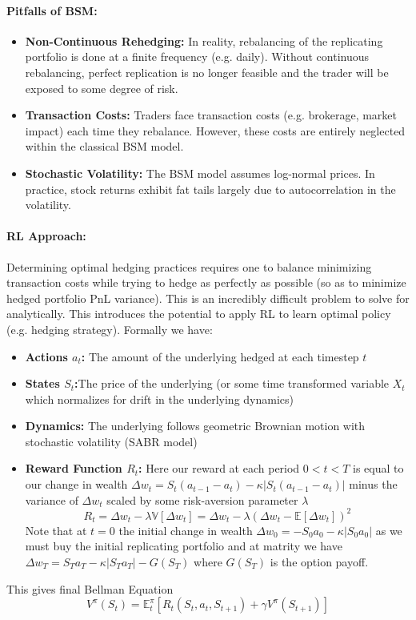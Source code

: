 \documentclass{article}
\begin{document}
\paragraph{Pitfalls of BSM:}
\begin{itemize}
    \item \textbf{Non-Continuous Rehedging:} In reality, rebalancing of the replicating portfolio is done at a finite frequency (e.g. daily). Without continuous rebalancing, perfect replication is no longer feasible and the trader will be exposed to some degree of risk.
    \item \textbf{Transaction Costs:} Traders face transaction costs (e.g. brokerage, market impact) each time they rebalance. However, these costs are entirely neglected within the classical BSM model.
    \item \textbf{Stochastic Volatility:} The BSM model assumes log-normal prices. In practice, stock returns exhibit fat tails largely due to autocorrelation in the volatility.
\end{itemize}

\paragraph{RL Approach:} Determining optimal hedging practices requires one to balance minimizing transaction costs while trying to hedge as perfectly as possible (so as to minimize hedged portfolio PnL variance). This is an incredibly difficult problem to solve for analytically. This introduces the potential to apply RL to learn optimal policy (e.g. hedging strategy). Formally we have:
\begin{itemize}
    \item \textbf{Actions $a_t$:}\cite{halperin}\cite{stoiljkovic} The amount of the underlying hedged at each timestep $t$
    \item \textbf{States $S_t$:}\cite{halperin}\cite{stoiljkovic}The price of the underlying (or some time transformed variable $X_t$ which normalizes for drift in the underlying dynamics)
    \item \textbf{Dynamics:} The underlying follows geometric Brownian motion with stochastic volatility (SABR model)\cite{cao}
    \item \textbf{Reward Function $R_t$:}
    Here our reward at each period $0<t<T$ is equal to our change in wealth $\Delta w_t = S_t(a_{t-1}-a_t)-\kappa|S_t(a_{t-1}-a_t)|$ minus the variance of $\Delta w_t$ scaled by some risk-aversion parameter $\lambda$ \cite{kolm}
    \[R_t = \Delta w_t - \lambda\mathbb{V}[\Delta w_t] = \Delta w_t - \lambda(\Delta w_t-\mathbb{E}[\Delta w_t])^2\]
    Note that at $t=0$ the initial change in wealth $\Delta w_0=-S_0a_0-\kappa |S_0a_0|$ as we must buy the initial replicating portfolio and at matrity we have  $\Delta w_T=S_Ta_T-\kappa |S_Ta_T|-G(S_T)$ where $G(S_T)$ is the option payoff.
\end{itemize}
This gives final Bellman Equation \[V^{\pi}(S_t) = \mathbb{E}^{\pi}_t[R_t(S_t,a_t,S_{t+1})+\gamma V^{\pi}(S_{t+1})]\]
\end{document}
